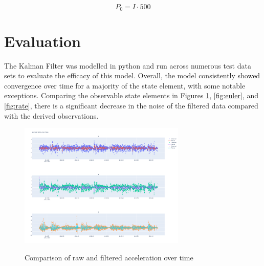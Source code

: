 \documentclass[12pt]{article}
\begin{document}
\begin{equation} 
P_0 = I\cdot500  
\end{equation}

\section{Evaluation}

The Kalman Filter was modelled in python and run across numerous test data sets to evaluate the efficacy of this model. Overall, the model consistently showed convergence over time for a majority of the state element, with some notable exceptions. Comparing the observable state elements in Figures \ref{fig:acc}, \ref{fig:euler}, and \ref{fig:rate}, there is a significant decrease in the noise of the filtered data compared with the derived observations. 

\begin{figure}[H]
    \centering
    \includegraphics[width=300px]{figures/acc_obs_comparison.png}\\
    \caption{Comparison of raw and filtered acceleration  over time}
    \label{fig:acc}
\end{figure}
\end{document}
